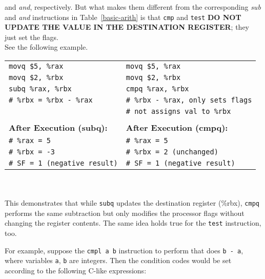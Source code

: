 and \textit{and}, respectively. But what makes them different from the 
corresponding \textit{sub} and \textit{and} instructions in Table~\ref{basic-arith} 
is that \texttt{cmp} and \texttt{test} \textbf{DO NOT UPDATE THE VALUE IN THE DESTINATION 
REGISTER}; they just set the flags.\\
%
See the following example.
\\
\begin{tabular}{l l}
\texttt{movq \$5, \%rax}   & \texttt{movq \$5, \%rax}   \\
\texttt{movq \$2, \%rbx}   & \texttt{movq \$2, \%rbx}   \\
\texttt{subq \%rax, \%rbx} & \texttt{cmpq \%rax, \%rbx} \\ 
\texttt{\# \%rbx = \%rbx - \%rax} & \texttt{\# \%rbx - \%rax, only sets flags} \\ 
                                & \texttt{\# not assigns val to \%rbx} \\ 
\\
\textbf{After Execution (subq):}  & \textbf{After Execution (cmpq):}  \\
\texttt{\# \%rax = 5}      & \texttt{\# \%rax = 5}      \\
\texttt{\# \%rbx = -3}     & \texttt{\# \%rbx = 2  (unchanged)} \\
\texttt{\# SF = 1 (negative result)} & \texttt{\# SF = 1 (negative result)}
\end{tabular}
\\
\\
This demonstrates that while \texttt{subq} updates the destination 
register (\%rbx), \texttt{cmpq} performs the same subtraction but 
only modifies the processor flags without changing the register contents. 
The same idea holds true for the \texttt{test} instruction, too.


For example, suppose the \texttt{cmpl a b} instruction to perform that 
does \texttt{b - a}, where variables \texttt{a}, \texttt{b} are integers. 
Then the condition codes would be set according to the following C-like expressions:


